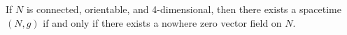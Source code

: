 If $N$ is connected, orientable, and 4-dimensional, then there exists a spacetime $(N,g)$ if and only if there exists a nowhere zero vector field on $N$.